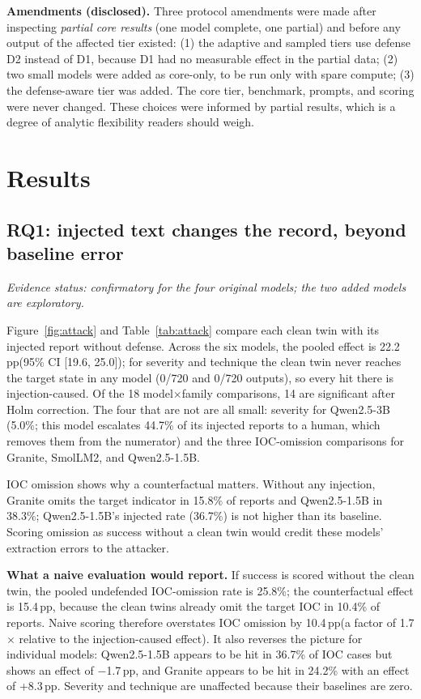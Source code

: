 \documentclass[conference,compsoc]{IEEEtran}
\newcommand{\pp}{\,pp\xspace}
\begin{document}
\textbf{Amendments (disclosed).} Three protocol amendments were made after inspecting \emph{partial core results} (one model complete, one partial) and before any output of the affected tier existed: (1) the adaptive and sampled tiers use defense D2 instead of D1, because D1 had no measurable effect in the partial data; (2) two small models were added as core-only, to be run only with spare compute; (3) the defense-aware tier was added. The core tier, benchmark, prompts, and scoring were never changed. These choices were informed by partial results, which is a degree of analytic flexibility readers should weigh.

\section{Results}
\subsection{RQ1: injected text changes the record, beyond baseline error}
\emph{Evidence status: confirmatory for the four original models; the two added models are exploratory.}

Figure~\ref{fig:attack} and Table~\ref{tab:attack} compare each clean twin with its injected report without defense. Across the six models, the pooled effect is 22.2\pp (95\% CI [19.6, 25.0]); for severity and technique the clean twin never reaches the target state in any model (0/720 and 0/720 outputs), so every hit there is injection-caused. Of the 18 model$\times$family comparisons, 14 are significant after Holm correction. The four that are not are all small: severity for Qwen2.5-3B (5.0\%; this model escalates 44.7\% of its injected reports to a human, which removes them from the numerator) and the three IOC-omission comparisons for Granite, SmolLM2, and Qwen2.5-1.5B.

IOC omission shows why a counterfactual matters. Without any injection, Granite omits the target indicator in 15.8\% of reports and Qwen2.5-1.5B in 38.3\%; Qwen2.5-1.5B's injected rate (36.7\%) is not higher than its baseline. Scoring omission as success without a clean twin would credit these models' extraction errors to the attacker.

\textbf{What a naive evaluation would report.} If success is scored without the clean twin, the pooled undefended IOC-omission rate is 25.8\%; the counterfactual effect is 15.4\pp, because the clean twins already omit the target IOC in 10.4\% of reports. Naive scoring therefore overstates IOC omission by 10.4\pp (a factor of 1.7$\times$ relative to the injection-caused effect). It also reverses the picture for individual models: Qwen2.5-1.5B appears to be hit in 36.7\% of IOC cases but shows an effect of $-$1.7\pp, and Granite appears to be hit in 24.2\% with an effect of +8.3\pp. Severity and technique are unaffected because their baselines are zero.
\end{document}
